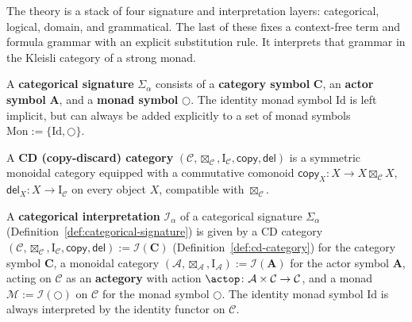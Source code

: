 The theory is a stack of four signature and interpretation layers:
categorical, logical, domain, and grammatical. The last of these fixes
a context-free term and formula grammar with an explicit substitution
rule. It interprets that grammar in the Kleisli category of a strong
monad.

\begin{definition}
\label{def:categorical-signature}
\leanok
A \textbf{categorical signature} $\Sigma_\alpha$ consists of a
\textbf{category symbol} $\mathbf C$, an \textbf{actor symbol}
$\mathbf A$, and a \textbf{monad symbol} $\bigcirc$. The identity monad
symbol $\mathrm{Id}$ is left implicit, but can always be added
explicitly to a set of monad symbols
$\mathrm{Mon} := \{\mathrm{Id}, \bigcirc\}$.
\end{definition}

\begin{definition}[CD category]
\label{def:cd-category}
\leanok
A \textbf{CD (copy-discard) category}
$(\mathcal C, \boxtimes_{\mathcal C}, \mathrm I_{\mathcal C}, \mathsf{copy}, \mathsf{del})$
is a symmetric monoidal category equipped with a commutative comonoid
$\mathsf{copy}_X \colon X \to X \boxtimes_{\mathcal C} X$,
$\mathsf{del}_X \colon X \to \mathrm I_{\mathcal C}$ on every object
$X$, compatible with $\boxtimes_{\mathcal C}$.
\end{definition}

\begin{definition}
\label{def:categorical-interpretation}
\leanok
A \textbf{categorical interpretation} $\mathcal I_\alpha$ of a
categorical signature $\Sigma_\alpha$ (Definition~\ref{def:categorical-signature})
is given by a CD category
$(\mathcal C, \boxtimes_{\mathcal C}, \mathrm I_{\mathcal C}, \mathsf{copy}, \mathsf{del}) := \mathcal I(\mathbf C)$
(Definition~\ref{def:cd-category}) for the category symbol $\mathbf C$,
a monoidal category
$(\mathcal A, \boxtimes_{\mathcal A}, \mathrm I_{\mathcal A}) := \mathcal I(\mathbf A)$
for the actor symbol $\mathbf A$, acting on $\mathcal C$ as an
\textbf{actegory} with action
$\actop \colon \mathcal A \times \mathcal C \to \mathcal C$, and a
monad $\mathcal M := \mathcal I(\bigcirc)$ on $\mathcal C$ for the
monad symbol $\bigcirc$. The identity monad symbol $\mathrm{Id}$ is
always interpreted by the identity functor on $\mathcal C$.
\end{definition}

